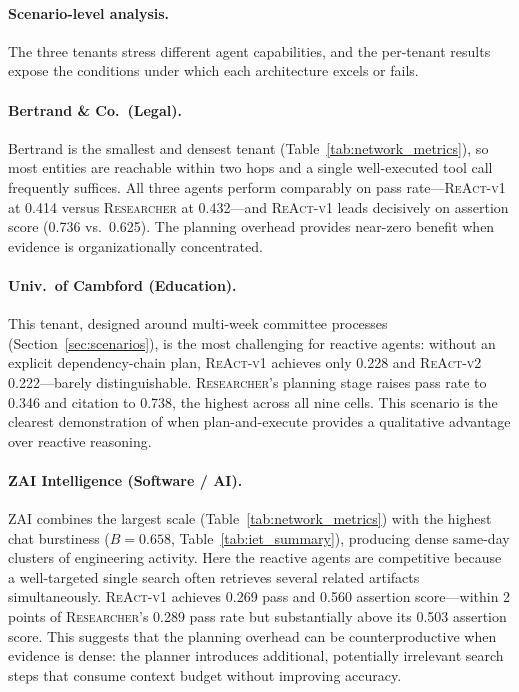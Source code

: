 \paragraph{Scenario-level analysis.}
\label{sec:scenario-analysis}

The three tenants stress different agent capabilities, and the per-tenant results expose the conditions under which each architecture excels or fails.

\paragraph{Bertrand \& Co.\ (Legal).} Bertrand is the smallest and densest tenant (Table~\ref{tab:network_metrics}), so most entities are reachable within two hops and a single well-executed tool call frequently suffices. All three agents perform comparably on pass rate---\textsc{ReAct-v1} at 0.414 versus \textsc{Researcher} at 0.432---and \textsc{ReAct-v1} leads decisively on assertion score (0.736 vs.\ 0.625). The planning overhead provides near-zero benefit when evidence is organizationally concentrated.

\paragraph{Univ.\ of Cambford (Education).} This tenant, designed around multi-week committee processes (Section~\ref{sec:scenarios}), is the most challenging for reactive agents: without an explicit dependency-chain plan, \textsc{ReAct-v1} achieves only 0.228 and \textsc{ReAct-v2} 0.222---barely distinguishable. \textsc{Researcher}'s planning stage raises pass rate to 0.346 and citation to 0.738, the highest across all nine cells. This scenario is the clearest demonstration of when plan-and-execute provides a qualitative advantage over reactive reasoning.

\paragraph{ZAI Intelligence (Software / AI).} ZAI combines the largest scale (Table~\ref{tab:network_metrics}) with the highest chat burstiness ($B = 0.658$, Table~\ref{tab:iet_summary}), producing dense same-day clusters of engineering activity. Here the reactive agents are competitive because a well-targeted single search often retrieves several related artifacts simultaneously. \textsc{ReAct-v1} achieves 0.269 pass and 0.560 assertion score---within 2 points of \textsc{Researcher}'s 0.289 pass rate but substantially above its 0.503 assertion score. This suggests that the planning overhead can be counterproductive when evidence is dense: the planner introduces additional, potentially irrelevant search steps that consume context budget without improving accuracy.


